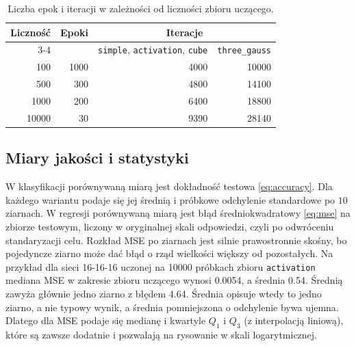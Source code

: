 \begin{table}[H]
    \centering
    \caption{Liczba epok i iteracji w zależności od liczności zbioru uczącego.}
    \label{tab:budget}
    \begin{tabular}{rrrr}
        \toprule
        Liczność & Epoki & \multicolumn{2}{c}{Iteracje} \\
        \cmidrule(lr){3-4}
        & & \texttt{simple}, \texttt{activation}, \texttt{cube} & \texttt{three\_gauss} \\
        \midrule
        \num{100} & \num{1000} & \num{4000} & \num{10000} \\
        \num{500} & \num{300} & \num{4800} & \num{14100} \\
        \num{1000} & \num{200} & \num{6400} & \num{18800} \\
        \num{10000} & \num{30} & \num{9390} & \num{28140} \\
        \bottomrule
    \end{tabular}
\end{table}

\subsection{Miary jakości i statystyki}
\label{sec:methodology-metrics}

W klasyfikacji porównywaną miarą jest dokładność testowa \eqref{eq:accuracy}. Dla każdego wariantu podaje się jej średnią i próbkowe odchylenie standardowe po $10$ ziarnach. W regresji porównywaną miarą jest błąd średniokwadratowy \eqref{eq:mse} na zbiorze testowym, liczony w oryginalnej skali odpowiedzi, czyli po odwróceniu standaryzacji celu. Rozkład MSE po ziarnach jest silnie prawostronnie skośny, bo pojedyncze ziarno może dać błąd o rząd wielkości większy od pozostałych. Na przykład dla sieci 16-16-16 uczonej na \num{10000} próbkach zbioru \texttt{activation} mediana MSE w zakresie zbioru uczącego wynosi \num{0.0054}, a średnia \num{0.54}. Średnią zawyża głównie jedno ziarno z błędem \num{4.64}. Średnia opisuje wtedy to jedno ziarno, a nie typowy wynik, a średnia pomniejszona o odchylenie bywa ujemna. Dlatego dla MSE podaje się medianę i kwartyle $Q_1$ i $Q_3$ (z interpolacją liniową), które są zawsze dodatnie i pozwalają na rysowanie w skali logarytmicznej.

